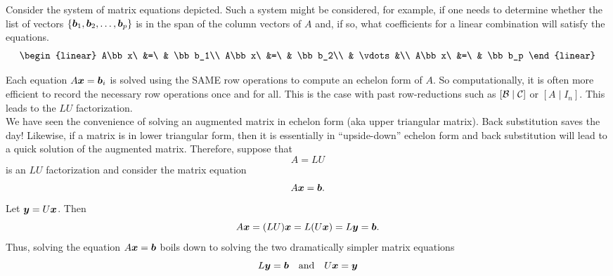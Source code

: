 \begin{multicols}{2}
Consider the system of matrix equations depicted.  Such a system might be considered, for example, if one needs to determine whether the list of vectors $\{\boldsymbol b_1, \boldsymbol b_2, \ldots, \boldsymbol b_p\}$ is in the span of the column vectors of $A$ and, if so, what coefficients for a linear combination will satisfy the equations.\columnbreak  
\[\begin{linear}
A\bb x\ &=\ & \bb b_1\\
A\bb x\ &=\ & \bb b_2\\
& \vdots &\\
A\bb x\ &=\ & \bb b_p
\end{linear}\]
\end{multicols}
\vspace{-0.15 in}\noindent
Each equation $A\boldsymbol x = \boldsymbol b_i$ is solved using the SAME row operations to compute an echelon form of $A$. 
So computationally, it is often more efficient to 
record the necessary row operations once and for all.  This is the case with past row-reductions such as \hyperref[eq:changeofbasismatrix]{$[ \mathcal{B} \mid \mathcal{C}]$} or \hyperref[eq:inversionalgorithm]{$[A \mid I_n]$}. This leads to the $LU$ factorization.\\


We have seen the convenience of solving an augmented matrix in echelon form (aka upper triangular matrix). Back substitution saves the day! Likewise, if a matrix is in lower triangular form, then it is essentially in ``upside-down'' echelon form and back substitution will lead to a quick solution of the augmented matrix. Therefore, suppose that 
\[A = LU\] is an $LU$ factorization and consider the matrix equation \[A\boldsymbol x = \boldsymbol b.\] Let $\boldsymbol y = U\boldsymbol x$. Then 
\[A\boldsymbol x = (LU)\boldsymbol x = L(U \boldsymbol x) = L\boldsymbol y = \boldsymbol b.\] Thus, solving the equation $A\boldsymbol x = \boldsymbol b$ boils down to solving the two dramatically simpler matrix equations 
\[L\boldsymbol y  = \boldsymbol b \quad\text{and}\quad U \boldsymbol x = \boldsymbol y\]

